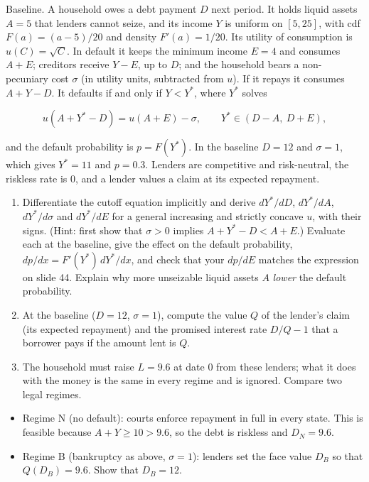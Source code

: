\documentclass[11pt,a4paper]{article}
\providecommand{\tightlist}{\setlength{\itemsep}{0pt}\setlength{\parskip}{0pt}}
\begin{document}
Baseline. A household owes a debt payment \(D\) next period. It holds liquid assets \(A = 5\) that
lenders cannot seize, and its income \(Y\) is uniform on \([5, 25]\), with cdf \(F(a) = (a - 5)/20\)
and density \(F'(a) = 1/20\). Its utility of consumption is \(u(C) = \sqrt{C}\). In default it keeps
the minimum income \(E = 4\) and consumes \(A + E\); creditors receive \(Y - E\), up to \(D\); and
the household bears a non-pecuniary cost \(\sigma\) (in utility units, subtracted from \(u\)). If it
repays it consumes \(A + Y - D\). It defaults if and only if \(Y < Y^*\), where \(Y^*\) solves

\[u(A + Y^* - D) = u(A + E) - \sigma, \qquad Y^* \in (D - A,\ D + E),\]

and the default probability is \(p = F(Y^*)\). In the baseline \(D = 12\) and \(\sigma = 1\), which
gives \(Y^* = 11\) and \(p = 0.3\). Lenders are competitive and risk-neutral, the riskless rate is
\(0\), and a lender values a claim at its expected repayment.

\begin{enumerate}
\def\labelenumi{(\alph{enumi})}
\item
  Differentiate the cutoff equation implicitly and derive \(dY^*/dD\), \(dY^*/dA\), \(dY^*/d\sigma\)
  and \(dY^*/dE\) for a general increasing and strictly concave \(u\), with their signs. (Hint:
  first show that \(\sigma > 0\) implies \(A + Y^* - D < A + E\).) Evaluate each at the baseline,
  give the effect on the default probability, \(dp/dx = F'(Y^*)\,dY^*/dx\), and check that your
  \(dp/dE\) matches the expression on slide 44. Explain why more unseizable liquid assets \(A\)
  \emph{lower} the default probability.
\item
  At the baseline (\(D = 12\), \(\sigma = 1\)), compute the value \(Q\) of the lender's claim (its
  expected repayment) and the promised interest rate \(D/Q - 1\) that a borrower pays if the amount
  lent is \(Q\).
\item
  The household must raise \(L = 9.6\) at date 0 from these lenders; what it does with the money is
  the same in every regime and is ignored. Compare two legal regimes.
\end{enumerate}

\begin{itemize}
\tightlist
\item
  Regime N (no default): courts enforce repayment in full in every state. This is feasible because
  \(A + Y \ge 10 > 9.6\), so the debt is riskless and \(D_N = 9.6\).
\item
  Regime B (bankruptcy as above, \(\sigma = 1\)): lenders set the face value \(D_B\) so that
  \(Q(D_B) = 9.6\). Show that \(D_B = 12\).
\end{itemize}
\end{document}
